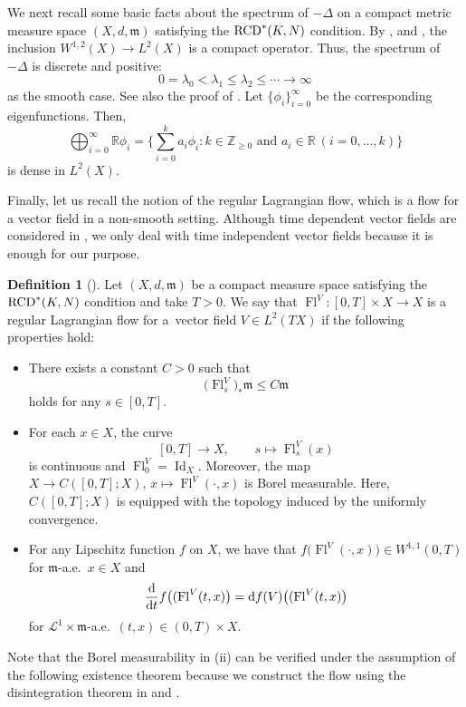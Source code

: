 \documentclass[10pt,a4paper]{amsart}
\numberwithin{equation}{section}
\theoremstyle{definition}
\newtheorem{Def}[Thm]{Definition}
\newcommand{\Id}{\operatorname{Id}}
\newcommand{\Fl}{\operatorname{Fl}}
\newcommand{\R}{\mathbb{R}}
\newcommand{\Z}{\mathbb{Z}}
\newcommand{\mf}{\mathfrak{m}}
\newcommand{\RCD}{{\rm RCD}^\ast}
\begin{document}
{\samepage
We next recall some basic facts about the spectrum of $-\Delta$ on a compact metric measure space $(X,d,\mf)$ satisfying the $\RCD(K,N)$ condition.
By \cite[Theorem~1.1]{Raj}, \cite[Theorem~1]{HK} and \cite[Theorem~8.1]{HK2}, the inclusion $W^{1,2}(X)\to L^2(X)$ is a compact operator.
Thus, the spectrum of~$-\Delta$ is discrete and positive:
\[
0=\lambda_0<\lambda_1\leq \lambda_2\leq\cdots\to \infty
\]
as the smooth case.
See also the proof of \cite[Theorem~4.22]{EKS}.
Let $\{\phi_i\}_{i=0}^\infty$ be the corresponding eigenfunctions.
Then,
\[
\bigoplus_{i=0}^\infty \R\phi_i=\bigg\{\sum_{i=0}^k a_i \phi_i\colon k\in\Z_{\geq 0}\text{ and }a_i\in \R\ (i=0,\ldots,k)\bigg\}
\]
is dense in $L^2(X)$.

}

Finally, let us recall the notion of the regular Lagrangian flow, which is a flow for a vector field in a non-smooth setting.
Although time dependent vector fields are considered in \cite{AT1}, we only deal with time independent vector fields because it is enough for our purpose.
\begin{Def}[\cite{AT1}]
Let $(X,d,\mf)$ be a compact measure space satisfying the $\RCD(K,N)$ condition and take $T>0$.
We say that $\Fl^V \colon [0,T]\times X\to X$ is a regular Lagrangian flow for a~vector field $V\in L^2(T X)$ if
the following properties hold:
\begin{itemize}\itemsep=0pt
\item[(i)] There exists a constant $C>0$ such that
\[
\big(\Fl^V_s\big)_\ast \mf\leq C \mf
\]
holds for any $s\in [0,T]$.
\item[(ii)] For each $x\in X$, the curve
\[
[0,T]\to X,\qquad
s\mapsto \Fl_s^V(x)
\]
is continuous and $\Fl_0^V=\Id_X$.
Moreover, the map $X\to C([0,T];X),\, x\mapsto \Fl^V(\cdot,x)$ is Borel measurable.
Here, $C([0,T];X)$ is equipped with the topology induced by the uniformly convergence.
\item[(iii)] For any Lipschitz function $f$ on $X$,
we have that
$f\big(\Fl^V(\cdot ,x)\big)\in W^{1,1}(0,T)$ for $\mf$-a.e.\ $x\in X$ and
\[
\frac{\rm d}{{\rm d} t}f\big((\Fl^V(t,x)\big)={\rm d} f(V) \big((\Fl^V(t,x)\big)
\]
for $\mathcal{L}^1\times\mf $-a.e.\ $(t,x)\in (0,T)\times X$.
\end{itemize}
\end{Def}
Note that the Borel measurability in (ii) can be verified under the assumption of the following existence theorem because we construct the flow using the disintegration theorem in \cite[Theorem~8.4]{AT1} and \cite[Theorem~7.8]{AT2}.
\end{document}
